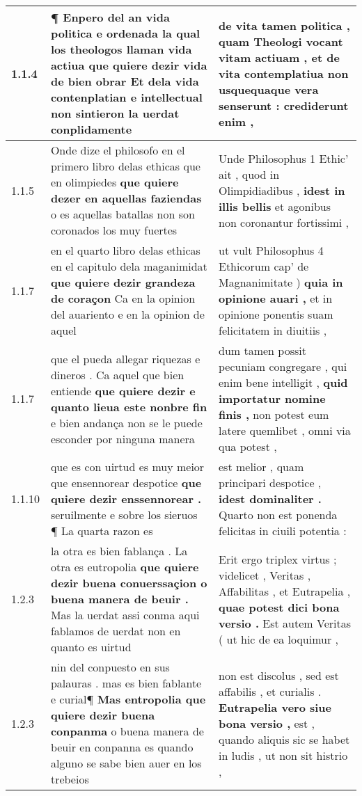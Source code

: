 \begin{tabular}{|p{1cm}|p{6.5cm}|p{6.5cm}|}

\hline
1.1.4 & ¶ Enpero del an vida politica e ordenada la qual los theologos llaman vida actiua \textbf{ que quiere dezir vida de bien obrar } Et dela vida contenplatian e intellectual non sintieron la uerdat conplidamente & de vita tamen politica , quam Theologi vocant vitam actiuam , \textbf{ et de vita contemplatiua } non usquequaque vera senserunt : crediderunt enim , \\\hline
1.1.5 & Onde dize el philosofo en el primero libro delas ethicas que en olimpiedes \textbf{ que quiere dezer en aquellas faziendas } o es aquellas batallas non son coronados los muy fuertes & Unde Philosophus 1 Ethic’ ait , quod in Olimpidiadibus , \textbf{ idest in illis bellis } et agonibus non coronantur fortissimi , \\\hline
1.1.7 & en el quarto libro delas ethicas en el capitulo dela maganimidat \textbf{ que quiere dezir grandeza de coraçon } Ca en la opinion del auariento e en la opinion de aquel & ut vult Philosophus 4 Ethicorum cap’ de Magnanimitate ) \textbf{ quia in opinione auari , } et in opinione ponentis suam felicitatem in diuitiis , \\\hline
1.1.7 & que el pueda allegar riquezas e dineros . Ca aquel que bien entiende \textbf{ que quiere dezir e quanto lieua este nonbre fin } e bien andança non se le puede esconder por ninguna manera & dum tamen possit pecuniam congregare , qui enim bene intelligit , \textbf{ quid importatur nomine finis , } non potest eum latere quemlibet , omni via qua potest , \\\hline
1.1.10 & que es con uirtud es muy meior que ensennorear despotice \textbf{ que quiere dezir enssennorear . } seruilmente e sobre los sieruos ¶ La quarta razon es & est melior , quam principari despotice , \textbf{ idest dominaliter . } Quarto non est ponenda felicitas in ciuili potentia : \\\hline
1.2.3 & la otra es bien fablança . La otra es eutropolia \textbf{ que quiere dezir buena conuerssaçion o buena manera de beuir . } Mas la uerdat assi conma aqui fablamos de uerdat non en quanto es uirtud & Erit ergo triplex virtus ; videlicet , Veritas , Affabilitas , et Eutrapelia , \textbf{ quae potest dici bona versio . } Est autem Veritas ( ut hic de ea loquimur , \\\hline
1.2.3 & nin del conpuesto en sus palauras . mas es bien fablante e curial¶ \textbf{ Mas entropolia que quiere dezir buena conpanma } o buena manera de beuir en conpanna es quando alguno se sabe bien auer en los trebeios & non est discolus , sed est affabilis , et curialis . \textbf{ Eutrapelia vero siue bona versio , } est , quando aliquis sic se habet in ludis , ut non sit histrio , \\\hline

\end{tabular}
